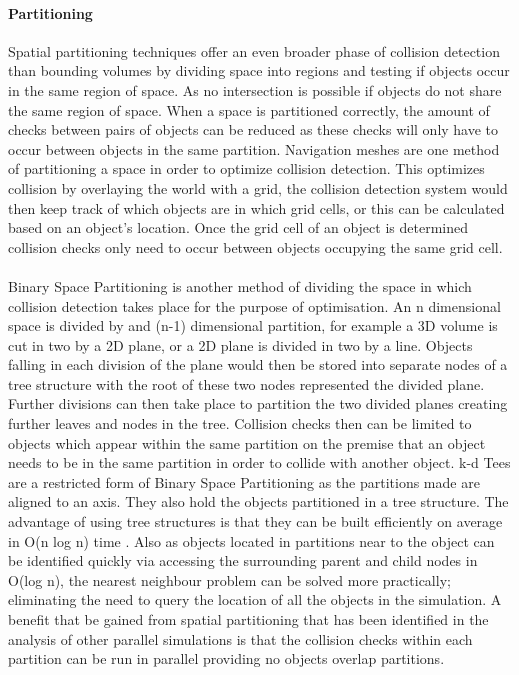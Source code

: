 \documentclass[main.tex]{subfiles}
\begin{document}
{{%

\paragraph{Partitioning} Spatial partitioning techniques offer an even broader phase of collision detection than bounding volumes by dividing space into regions and testing if objects occur in the same region of space. As no intersection is possible if objects do not share the same region of space. When a space is partitioned correctly, the amount of checks between pairs of objects can be reduced as these checks will only have to occur between objects in the same partition. Navigation meshes are one method of partitioning a space in order to optimize collision detection. This optimizes collision by overlaying the world with a grid, the collision detection system would then keep track of which objects are in which grid cells, or this can be calculated based on an object's location. Once the grid cell of an object is determined collision checks only need to occur between objects occupying the same grid cell.

\paragraph{}Binary Space Partitioning is another method of dividing the space in which collision detection takes place for the purpose of optimisation. An n dimensional space is divided by and (n-1) dimensional partition, for example a 3D volume is cut in two by a 2D plane, or a 2D plane is divided in two by a line. Objects falling in each division of the plane would then be stored into separate nodes of a tree structure with the root of these two nodes represented the divided plane. Further divisions can then take place to partition the two divided planes creating further leaves and nodes in the tree. Collision checks then can be limited to objects which appear within the same partition on the premise that an object needs to be in the same partition in order to collide with another object. k-d Tees are a restricted form of Binary Space Partitioning as the partitions made are aligned to an axis. They also hold the objects partitioned in a tree structure. The advantage of using tree structures is that they can be built efficiently on average in O(n log n) time \cite{Ericson2005}. Also as objects located in partitions near to the object can be identified quickly via accessing the surrounding parent and child nodes in O(log n), the nearest neighbour problem can be solved more practically; eliminating the need to query the location of all the objects in the simulation. A benefit that be gained from spatial partitioning that has been identified in the analysis of other parallel simulations  is that the collision checks within each partition can be run in parallel providing no objects overlap partitions.


}}
\end{document}
